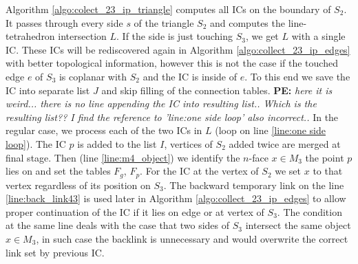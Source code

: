 \documentclass{elsarticle}
\newcommand{\notePE}[1]{{\color{Orange} \textbf{PE: } \textit{#1}}}
\newcommand{\nface}{$n$-face }
\begin{document}
Algorithm \ref{algo:colect_23_ip_triangle} computes all ICs on the boundary of $S_2$.  It passes through every side $s$ of the triangle $S_2$ 
and computes the line-tetrahedron intersection $L$.
If the side is just touching $S_3$, we get $L$ with a single IC. These ICs will be rediscovered again in Algorithm \ref{algo:collect_23_ip_edges} 
with better topological information, however this is not the case if the touched edge $e$ of $S_3$ is coplanar with $S_2$ and the IC is inside of $e$.
To this end we save the IC into separate list $J$ and skip filling of the connection tables.
\notePE{here it is weird... there is no line appending the IC into resulting list.. Which is the resulting list??
I find the reference to 'line:one side loop' also incorrect..}
In the regular case, we process each of the two ICs in $L$ (loop on line \ref{line:one side loop}). The IC $p$ is added to the list $I$,
vertices of $S_2$ added twice are merged at final stage. Then (line \ref{line:m4_object}) we identify the \nface $x\in M_3$ 
the point $p$ lies on and set the tables $F_g$, $F_p$. For the IC at the vertex of $S_2$ we set $x$ to that vertex regardless of its position on $S_3$.
The backward temporary link on the line \ref{line:back_link43} is used later in Algorithm \ref{algo:collect_23_ip_edges} to allow proper continuation 
of the IC if it lies on edge or at vertex of $S_3$. The condition at the same line deals with the case that two sides of $S_3$ intersect 
the same object $x\in M_3$, in such case the backlink is unnecessary and would overwrite the correct link set by previous IC.
\end{document}
